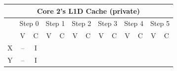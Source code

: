 \documentclass[a4paper,10pt]{article}
\begin{document}
\begin{enumerate}
{        \begin{table}[!hbpt]
        \centering
        \begin{tabular}{|ccccccccccccc|}
        \hline
        \multicolumn{13}{|c|}{Core 2's L1D Cache (private)}                                                                                                                                                                                                                                                                                                                                                                                                             \\ \hline
        \multicolumn{1}{|c|}{}  & \multicolumn{2}{c|}{Step 0}                      & \multicolumn{2}{c|}{\cellcolor[HTML]{C0C0C0}Step 1}                                             & \multicolumn{2}{c|}{Step 2}                     & \multicolumn{2}{c|}{\cellcolor[HTML]{C0C0C0}Step 3}                                             & \multicolumn{2}{c|}{Step 4}                     & \multicolumn{2}{c|}{\cellcolor[HTML]{C0C0C0}Step 5}                        \\ \hline
        \multicolumn{1}{|c|}{}  & \multicolumn{1}{c|}{V}  & \multicolumn{1}{c|}{C} & \multicolumn{1}{c|}{\cellcolor[HTML]{C0C0C0}V} & \multicolumn{1}{c|}{\cellcolor[HTML]{C0C0C0}C} & \multicolumn{1}{c|}{V} & \multicolumn{1}{c|}{C} & \multicolumn{1}{c|}{\cellcolor[HTML]{C0C0C0}V} & \multicolumn{1}{c|}{\cellcolor[HTML]{C0C0C0}C} & \multicolumn{1}{c|}{V} & \multicolumn{1}{c|}{C} & \multicolumn{1}{c|}{\cellcolor[HTML]{C0C0C0}V} & \cellcolor[HTML]{C0C0C0}C \\ \hline
        \multicolumn{1}{|c|}{X} & \multicolumn{1}{c|}{--} & \multicolumn{1}{c|}{I} & \multicolumn{1}{c|}{\cellcolor[HTML]{C0C0C0}}  & \multicolumn{1}{c|}{\cellcolor[HTML]{C0C0C0}}  & \multicolumn{1}{c|}{}  & \multicolumn{1}{c|}{}  & \multicolumn{1}{c|}{\cellcolor[HTML]{C0C0C0}}  & \multicolumn{1}{c|}{\cellcolor[HTML]{C0C0C0}}  & \multicolumn{1}{c|}{}  & \multicolumn{1}{c|}{}  & \multicolumn{1}{c|}{\cellcolor[HTML]{C0C0C0}}  & \cellcolor[HTML]{C0C0C0}  \\ \hline
        \multicolumn{1}{|c|}{Y} & \multicolumn{1}{c|}{--} & \multicolumn{1}{c|}{I} & \multicolumn{1}{c|}{\cellcolor[HTML]{C0C0C0}}  & \multicolumn{1}{c|}{\cellcolor[HTML]{C0C0C0}}  & \multicolumn{1}{c|}{}  & \multicolumn{1}{c|}{}  & \multicolumn{1}{c|}{\cellcolor[HTML]{C0C0C0}}  & \multicolumn{1}{c|}{\cellcolor[HTML]{C0C0C0}}  & \multicolumn{1}{c|}{}  & \multicolumn{1}{c|}{}  & \multicolumn{1}{c|}{\cellcolor[HTML]{C0C0C0}}  & \cellcolor[HTML]{C0C0C0}  \\ \hline
        \end{tabular}
        \end{table}
        
}
\end{enumerate}
\end{document}

